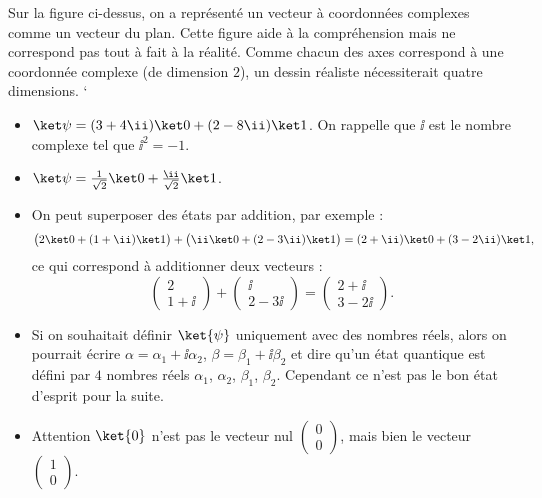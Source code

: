\documentclass[11pt,class=report,crop=false]{standalone}
\begin{document}
Sur la figure ci-dessus, on a représenté un vecteur à coordonnées complexes comme un vecteur du plan. Cette figure aide à la compréhension mais ne correspond pas tout à fait à la réalité. Comme chacun des axes correspond à une coordonnée complexe (de dimension $2$), un dessin réaliste nécessiterait quatre dimensions. 
`
\bigskip

\begin{exemple}
\sauteligne
\begin{itemize}
  \item $\ket\psi = (3+4\ii)\ket0 + (2-8\ii)\ket1$. On rappelle que $\ii$ est le nombre complexe tel que $\ii^2=-1$.
  

  
  \item $\ket\psi = \frac{1}{\sqrt2} \ket0 + \frac{\ii}{\sqrt2}\ket1$.
  

  
  \item On peut superposer des états par addition, par exemple :
  $$\big( 2\ket0+(1+\ii)\ket1\big) + \big( \ii\ket0+(2-3\ii)\ket1\big)
  = (2+\ii)\ket0+(3-2\ii)\ket1,$$
  ce qui correspond à additionner deux vecteurs :
  $$\begin{pmatrix}2\\1+\ii\end{pmatrix}+ \begin{pmatrix}\ii\\2-3\ii\end{pmatrix}
  =\begin{pmatrix}2+\ii\\3-2\ii\end{pmatrix}.$$
\end{itemize}

\end{exemple}


\begin{remarque*}
\sauteligne
\begin{itemize}
  \item Si on souhaitait définir $\ket{\psi}$ uniquement avec des nombres réels, alors on pourrait écrire $\alpha = \alpha_1+\ii \alpha_2$, $\beta = \beta_1+\ii \beta_2$ et dire qu'un état quantique est défini par $4$ nombres réels $\alpha_1$, $\alpha_2$, $\beta_1$, $\beta_2$. Cependant ce n'est pas le bon état d'esprit pour la suite.
  
  \item Attention $\ket{0}$ n'est pas le vecteur nul $\left(\begin{smallmatrix}0\\0\end{smallmatrix}\right)$, mais bien le vecteur 
  $\left(\begin{smallmatrix}1\\0\end{smallmatrix}\right)$.
  
\end{itemize}
\end{remarque*}
\end{document}
